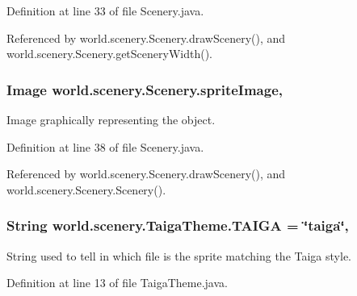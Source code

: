 Definition at line 33 of file Scenery.\-java.



Referenced by world.\-scenery.\-Scenery.\-draw\-Scenery(), and world.\-scenery.\-Scenery.\-get\-Scenery\-Width().

\hypertarget{a00024_a512d9c0a154e6843389e343d80843326}{
\subsubsection[{sprite\-Image}]{\setlength{\rightskip}{0pt plus 5cm}Image world.\-scenery.\-Scenery.\-sprite\-Image\hspace{0.3cm}{\ttfamily [protected]}, {\ttfamily [inherited]}}}\label{a00024_a512d9c0a154e6843389e343d80843326}


Image graphically representing the object. 



Definition at line 38 of file Scenery.\-java.



Referenced by world.\-scenery.\-Scenery.\-draw\-Scenery(), and world.\-scenery.\-Scenery.\-Scenery().

\hypertarget{a00028_ad3418d8f4936efb0ef1e3eb2009a34f0}{
\subsubsection[{T\-A\-I\-G\-A}]{\setlength{\rightskip}{0pt plus 5cm}String world.\-scenery.\-Taiga\-Theme.\-T\-A\-I\-G\-A = \char`\"{}taiga\char`\"{}\hspace{0.3cm}{\ttfamily [static]}, {\ttfamily [inherited]}}}\label{a00028_ad3418d8f4936efb0ef1e3eb2009a34f0}


String used to tell in which file is the sprite matching the Taiga style. 



Definition at line 13 of file Taiga\-Theme.\-java.

